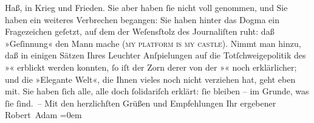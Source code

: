 \begin{ledgroupsized}[t]{13cm}
               Haß, in Krieg und Frieden. Sie aber haben ſie nicht voll genommen, und Sie haben ein
               weiteres Verbrechen begangen: Sie haben hinter das Dogma ein Fragezeichen geſetzt,
               auf dem der Weſensſtolz des Journaliſten ruht: daß »Geſinnung« den Mann mache (\textsc{my platform is my castle}). Nimmt man hinzu, daß in einigen
               Sätzen Ihres Leuchter
               Anſpielungen auf die Totſchweigepolitik des »\label{K_L02281_1v}\label{K_L02281_1h}« erblickt werden konnten, ſo iſt der
               Zorn derer von der »\label{K_L02281_2v}\label{K_L02281_2h}« noch
               erklärlicher; und die »Elegante Welt«, die Ihnen vieles noch nicht verziehen hat,
               geht eben mit. Sie haben ſich alle, alle doch ſolidariſch erklärt: ſie bleiben – im
               Grunde, was ſie ſind. –\pend
           \pstart
           Mit den herzlichſten Grüßen {\pb}und
               Empfehlungen Ihr ergebener{\\[\baselineskip]}\spacefill\mbox{Robert Adam}\pend
           \leftskip=0em{}
         
         \endnumbering{}\end{ledgroupsized}  \newcommand{\dateiname}{L02281}\newcommand{\titel}{Robert Adam an Arthur Schnitzler, 23. 11. 1917}\newcommand{\editorInnen}{Martin Anton Müller und Gerd-Hermann Susen}
      